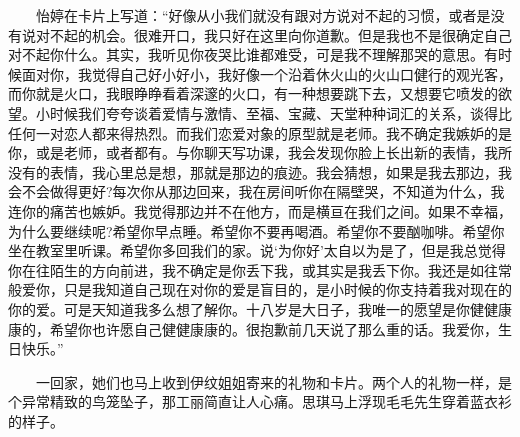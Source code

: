 \documentclass[12pt,UTF8]{ctexbook}
\begin{document}
　　怡婷在卡片上写道：\enquote{好像从小我们就没有跟对方说对不起的习惯，或者是没有说对不起的机会。很难开口，我只好在这里向你道歉。但是我也不是很确定自己对不起你什么。其实，我听见你夜哭比谁都难受，可是我不理解那哭的意思。有时候面对你，我觉得自己好小好小，我好像一个沿着休火山的火山口健行的观光客，而你就是火口，我眼睁睁看着深邃的火口，有一种想要跳下去，又想要它喷发的欲望。小时候我们夸夸谈着爱情与激情、至福、宝藏、天堂种种词汇的关系，谈得比任何一对恋人都来得热烈。而我们恋爱对象的原型就是老师。我不确定我嫉妒的是你，或是老师，或者都有。与你聊天写功课，我会发现你脸上长出新的表情，我所没有的表情，我心里总是想，那就是那边的痕迹。我会猜想，如果是我去那边，我会不会做得更好?每次你从那边回来，我在房间听你在隔壁哭，不知道为什么，我连你的痛苦也嫉妒。我觉得那边并不在他方，而是横亘在我们之间。如果不幸福，为什么要继续呢?希望你早点睡。希望你不要再喝酒。希望你不要酗咖啡。希望你坐在教室里听课。希望你多回我们的家。说`为你好'太自以为是了，但是我总觉得你在往陌生的方向前进，我不确定是你丢下我，或其实是我丢下你。我还是如往常般爱你，只是我知道自己现在对你的爱是盲目的，是小时候的你支持着我对现在的你的爱。可是天知道我多么想了解你。十八岁是大日子，我唯一的愿望是你健健康康的，希望你也许愿自己健健康康的。很抱歉前几天说了那么重的话。我爱你，生日快乐。}

　　一回家，她们也马上收到伊纹姐姐寄来的礼物和卡片。两个人的礼物一样，是个异常精致的鸟笼坠子，那工丽简直让人心痛。思琪马上浮现毛毛先生穿着蓝衣衫的样子。
\end{document}
